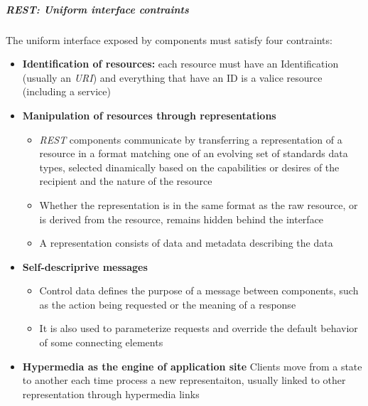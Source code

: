 \documentclass{article}
\begin{document}
    \subparagraph{REST: Uniform interface contraints}
    The uniform interface exposed by components must satisfy four contraints:
    \begin{itemize}
        \item \textbf{Identification of resources:} each resource must have an Identification
            (usually an \textit{URI}) and everything that have an ID is a valice resource 
            (including a service)
        \item \textbf{Manipulation of resources through representations}
        \begin{itemize}
            \item \textit{REST} components communicate by transferring a representation of a
                resource in a format matching one of an evolving set of standards data types,
                selected dinamically based on the capabilities or desires of the recipient and
                the nature of the resource
            \item Whether the representation is in the same format as the raw
                resource, or is derived from the resource, remains hidden behind the interface
            \item A representation consists of data and metadata describing the data
        \end{itemize}
        \item \textbf{Self-descriprive messages}
        \begin{itemize}
            \item Control data defines the purpose of a message between components, such as the 
                action being requested or the meaning of a response
            \item It is also used to parameterize requests and override the default behavior of
                some connecting elements
        \end{itemize}
        \item \textbf{Hypermedia as the engine of application site}
            Clients move from a state to another each time process a new representaiton, usually
            linked to other representation through hypermedia links
    \end{itemize}
\end{document}
